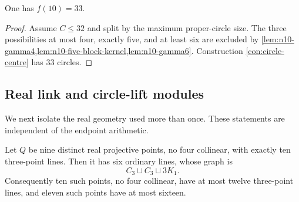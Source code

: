 \begin{proposition}\label{prop:n10-value}
One has $f(10)=33$.
\end{proposition}

\begin{proof}
Assume $C\le32$ and split by the maximum proper-circle size.  The three
possibilities at most four, exactly five, and at least six are excluded by
\cref{lem:n10-gamma4,lem:n10-five-block-kernel,lem:n10-gamma6}.
Construction \ref{con:circle-centre} has $33$ circles.
\end{proof}

\subsection{Real link and circle-lift modules}

We next isolate the real geometry used more than once.  These statements
are independent of the endpoint arithmetic.

\begin{lemma}\label{lem:real-nine-link}
Let $Q$ be nine distinct real projective points, no four collinear, with
exactly ten three-point lines.  Then it has six ordinary lines, whose graph
is
\[
 C_3\sqcup C_3\sqcup3K_1.
\]
Consequently ten such points, no four collinear, have at most twelve
three-point lines, and eleven such points have at most sixteen.
\end{lemma}

